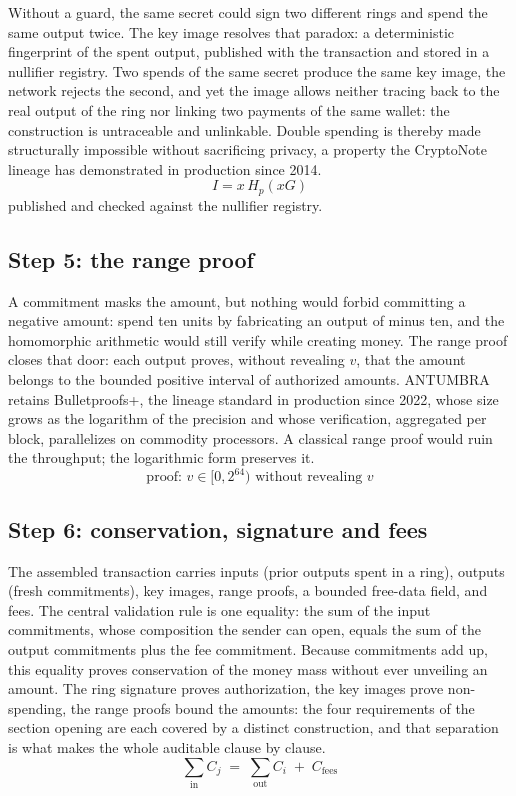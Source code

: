 Without a guard, the same secret could sign two different rings and spend
the same output twice. The key image resolves that paradox: a
deterministic fingerprint of the spent output, published with the
transaction and stored in a nullifier registry. Two spends of the same
secret produce the same key image, the network rejects the second, and yet
the image allows neither tracing back to the real output of the ring nor
linking two payments of the same wallet: the construction is untraceable
and unlinkable. Double spending is thereby made structurally impossible
without sacrificing privacy, a property the CryptoNote lineage has
demonstrated in production since 2014.
\begin{equation}\label{eq:keyimage}
I = x\,H_p(xG)
\end{equation}
published and checked against the nullifier registry.

\subsection{Step 5: the range proof}

A commitment masks the amount, but nothing would forbid committing a
negative amount: spend ten units by fabricating an output of minus ten,
and the homomorphic arithmetic would still verify while creating money.
The range proof closes that door: each output proves, without revealing
$v$, that the amount belongs to the bounded positive interval of
authorized amounts. ANTUMBRA retains Bulletproofs+, the lineage standard
in production since 2022, whose size grows as the logarithm of the
precision and whose verification, aggregated per block, parallelizes on
commodity processors. A classical range proof would ruin the throughput;
the logarithmic form preserves it.
\begin{equation}\label{eq:range}
\text{proof: } v \in [0, 2^{64}) \text{ without revealing } v
\end{equation}

\subsection{Step 6: conservation, signature and fees}

The assembled transaction carries inputs (prior outputs spent in a ring),
outputs (fresh commitments), key images, range proofs, a bounded free-data
field, and fees. The central validation rule is one equality: the sum of
the input commitments, whose composition the sender can open, equals the
sum of the output commitments plus the fee commitment. Because commitments
add up, this equality proves conservation of the money mass without ever
unveiling an amount. The ring signature proves authorization, the key
images prove non-spending, the range proofs bound the amounts: the four
requirements of the section opening are each covered by a distinct
construction, and that separation is what makes the whole auditable
clause by clause.
\begin{equation}\label{eq:conservation}
\sum_{\mathrm{in}} C_j \;=\; \sum_{\mathrm{out}} C_i \;+\; C_{\mathrm{fees}}
\end{equation}

